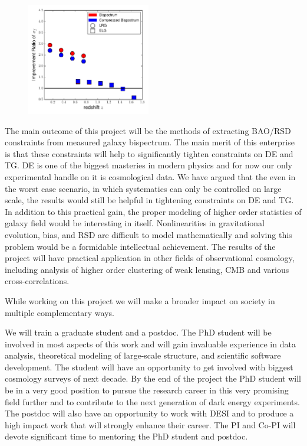 
\begin{figure}
\begin{center}
\includegraphics[width=0.48\textwidth]{fz.pdf}
\end{center}
\end{figure}
The main outcome of this project will be the methods of extracting BAO/RSD
constraints from measured galaxy bispectrum. The main merit of this enterprise
is that these constraints will help to significantly tighten constraints on DE
and TG. DE is one of the biggest masteries in modern physics and for now our
only experimental handle on it is cosmological data. We have argued that the
even in the worst case scenario, in which systematics can only be controlled on
large scale, the results would still be helpful in tightening constraints on DE
and TG. In addition to this practical gain, the proper modeling of higher order
statistics of galaxy field would be interesting in itself. Nonlinearities in
gravitational evolution, bias, and RSD are difficult to model mathematically
and solving this problem would be a formidable intellectual achievement. The
results of the project will have practical application in other fields of
observational cosmology, including analysis of higher order clustering of weak
lensing, CMB and various cross-correlations.


While working on this project we will make a broader impact on society in
multiple complementary ways.

We will train a graduate student and a postdoc. The PhD student will be
involved in most aspects of this work and will gain invaluable experience in
data analysis, theoretical modeling of large-scale structure, and scientific
software development. The student will have an opportunity to get involved with
biggest cosmology surveys of next decade. By the end of the project the PhD
student will be in a very good position to pursue the research career in this
very promising field further and to contribute to the next generation of dark
energy experiments. The postdoc will also have an opportunity to work with DESI
and to produce a high impact work that will strongly enhance their career. The
PI and Co-PI will devote significant time to mentoring the PhD student and
postdoc.

